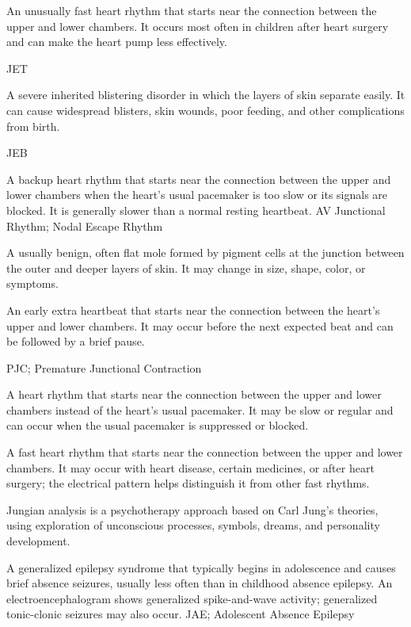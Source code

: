  An unusually fast heart rhythm that starts near the connection between the upper and lower chambers. It occurs most often in children after heart surgery and can make the heart pump less effectively.

\synonyms
JET

 A severe inherited blistering disorder in which the layers of skin separate easily. It can cause widespread blisters, skin wounds, poor feeding, and other complications from birth.

\synonyms
JEB

 A backup heart rhythm that starts near the connection between the upper and lower chambers when the heart's usual pacemaker is too slow or its signals are blocked. It is generally slower than a normal resting heartbeat.
\synonyms
AV Junctional Rhythm; Nodal Escape Rhythm

 A usually benign, often flat mole formed by pigment cells at the junction between the outer and deeper layers of skin. It may change in size, shape, color, or symptoms.

 An early extra heartbeat that starts near the connection between the heart's upper and lower chambers. It may occur before the next expected beat and can be followed by a brief pause.

\synonyms
PJC; Premature Junctional Contraction

 A heart rhythm that starts near the connection between the upper and lower chambers instead of the heart’s usual pacemaker. It may be slow or regular and can occur when the usual pacemaker is suppressed or blocked.

 A fast heart rhythm that starts near the connection between the upper and lower chambers. It may occur with heart disease, certain medicines, or after heart surgery; the electrical pattern helps distinguish it from other fast rhythms.

 Jungian analysis is a psychotherapy approach based on Carl Jung’s theories, using exploration of unconscious processes, symbols, dreams, and personality development.

 A generalized epilepsy syndrome that typically begins in adolescence and causes brief absence seizures, usually less often than in childhood absence epilepsy. An electroencephalogram shows generalized spike-and-wave activity; generalized tonic-clonic seizures may also occur.
\synonyms
JAE; Adolescent Absence Epilepsy

